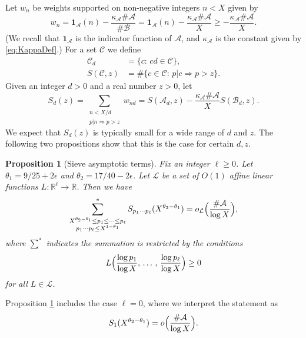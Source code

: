 \documentclass[10pt]{amsart}
\theoremstyle{plain}
\newtheorem{prpstn}[thrm]{Proposition}
\numberwithin{sblmm}{thrm}
\numberwithin{equation}{section}
\begin{document}
Let $w_n$ be weights supported on non-negative integers $n<  X$ given by
\begin{equation}
w_n=\mathbf{1}_{\mathcal{A}{}}(n)-\frac{\kappa_\mathcal{A}\#\mathcal{A}{}}{\#\mathcal{B}{}}=\mathbf{1}_{\mathcal{A}{}}(n)-\frac{\kappa_\mathcal{A}\#\mathcal{A}{}}{X}\ge -\frac{\kappa_\mathcal{A}\#\mathcal{A}{}}{X}.
\label{eq:WDef}
\end{equation}
 (We recall that $\mathbf{1}_{\mathcal{A}}$ is the indicator function of $\mathcal{A}$, and $\kappa_\mathcal{A}$ is the constant given by \eqref{eq:KappaDef}.)  For a set $\mathcal{C}$ we define
%
\begin{align*}
\mathcal{C}_d&=\{c:\,c d\in\mathcal{C}\},\\
S(\mathcal{C},z)&=\#\{c\in\mathcal{C}:\,p|c\Rightarrow p>z\}.
\end{align*}
%
Given an integer $d>0$ and a real number $z>0$, let
%
\begin{equation}
S_d(z)=\sum_{\substack{n<X/d\\ p|n\Rightarrow p>z}}w_{n d}=S(\mathcal{A}{}_d,z)-\frac{\kappa_\mathcal{A}\#\mathcal{A}{}}{X}S(\mathcal{B}{}_d,z).
\label{eq:SWDef}
\end{equation}
%
We expect that $S_d(z)$ is typically small for a wide range of $d$ and $z$. The following two propositions show that this is the case for certain $d,z$.
%
%
%
%
\begin{prpstn}[Sieve asymptotic terms]\label{prpstn:FinalSieve}
%
Fix an integer $\ell\ge 0$. Let $\theta_1=9/25+2\epsilon$ and $\theta_2=17/40-2\epsilon$. Let $\mathcal{L}$ be a set of $O(1)$ affine linear functions $L:\mathbb{R}^\ell\rightarrow\mathbb{R}$. Then we have
\[
\sum_{\substack{X^{\theta_2-\theta_1}\le p_1\le \dots\le p_\ell \\ p_1\cdots p_\ell\le X^{1-\theta_1}}}^* S_{p_1\cdots p_\ell}(X^{\theta_2-\theta_1})=o_{\mathcal{L}}\Bigl(\frac{\#\mathcal{A}}{\log{X}}\Bigr),
\]
where $\sum^*$ indicates the summation is restricted by the conditions
\[
L\Bigl(\frac{\log{p}_1}{\log{X}},\,\dots\,,\,\frac{\log{p_\ell}}{\log{X}}\Bigr)\ge 0
\]
for all $L\in\mathcal{L}$.
%
\end{prpstn}
%
Proposition \ref{prpstn:FinalSieve} includes the case $\ell=0$, where we interpret the statement as
\begin{equation}
S_1(X^{\theta_2-\theta_1})=o\Bigl(\frac{\#\mathcal{A}}{\log{X}}\Bigr).
\label{eq:BasicSieveBound}
\end{equation}
\end{document}
